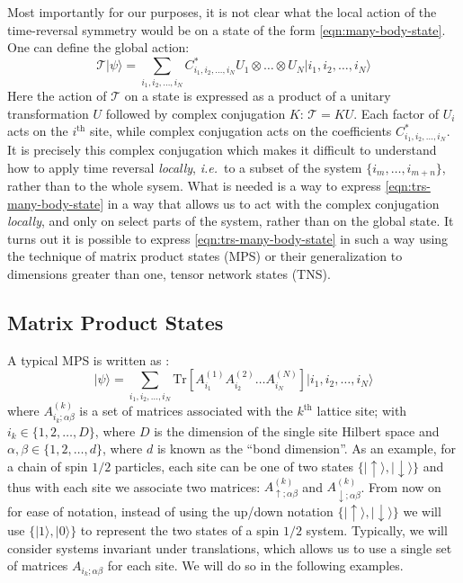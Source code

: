 \documentclass[preprint]{SciPost}
\newcommand{\ie}{\textit{i.e.}~}
\newcommand{\mc}[1]{\mathcal{#1}}
\newcommand{\ket}[1]{\vert #1 \rangle}
\newcommand{\Tr}{\mathrm{Tr}}
\theoremstyle{plain} %
\begin{document}
Most importantly for our purposes, it is not clear what the local action of the time-reversal symmetry would be on a state of the form \eqref{eqn:many-body-state}. One can define the global action:
\begin{equation}\label{eqn:trs-many-body-state}
	\mc{T} \ket{\psi} = \sum_{i_1, i_2, \ldots, i_N} C^*_{i_1, i_2, \ldots, i_N} U_1 \otimes \ldots \otimes U_N \ket{i_1, i_2, \ldots, i_N}
\end{equation}
Here the action of $ \mc{T} $ on a state is expressed as a product of a unitary transformation $ U $ followed by complex conjugation $ K $: $ \mc{T} = KU $. Each factor of $ U_i $ acts on the $ i^\text{th} $ site, while complex conjugation acts on the coefficients $ C^*_{i_1, i_2, \ldots, i_N} $. It is precisely this complex conjugation which makes it difficult to understand how to apply time reversal \emph{locally}, \ie to a subset of the system $ \{i_m, \ldots, i_{m+n}\} $, rather than to the whole sysem. What is needed is a way to express \eqref{eqn:trs-many-body-state} in a way that allows us to act with the complex conjugation \emph{locally}, and only on select parts of the system, rather than on the global state. It turns out it is possible to express \eqref{eqn:trs-many-body-state} in such a way using the technique of matrix product states (MPS) or their generalization to dimensions greater than one, tensor network states (TNS).

\subsection{Matrix Product States}\label{subsec:mps}

A typical MPS is written as \cite[Sec 3]{Bridgeman2016Hand-waving}:
\begin{equation}\label{eqn:mps-ansatz}
	\ket{\psi} = \sum_{i_1, i_2, \ldots, i_N} \Tr\left[ A^{(1)}_{i_1} A^{(2)}_{i_2} \ldots A^{(N)}_{i_N} \right] \ket{i_1, i_2, \ldots, i_N}
\end{equation}
where $ A^{(k)}_{i_k;\alpha\beta} $ is a set of matrices associated with the $ k^\text{th} $ lattice site; with $ i_k \in \{1,2,\ldots,D\} $, where $ D $ is the dimension of the single site Hilbert space and $ \alpha, \beta \in \{ 1, 2, \ldots, d\} $, where $ d $ is known as the ``bond dimension''. As an example, for a chain of spin $ 1/2 $ particles, each site can be one of two states $ \{\ket{\uparrow}, \ket{\downarrow} \} $ and thus with each site we associate two matrices: $ A^{(k)}_{\uparrow;\alpha\beta}  $ and $ A^{(k)}_{\downarrow; \alpha\beta} $. From now on for ease of notation, instead of using the up/down notation $ \{\ket{\uparrow}, \ket{\downarrow} \} $ we will use $ \{ \ket{1}, \ket{0} \} $ to represent the two states of a spin $ 1/2 $ system. Typically, we will consider systems invariant under translations, which allows us to use a single set of matrices $ A_{i_k;\alpha\beta} $ for each site. We will do so in the following examples.
\end{document}
